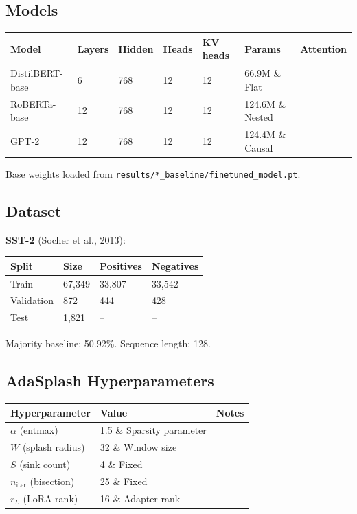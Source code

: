 \subsection{Models}

\begin{table}[H]
\centering
\small
\begin{tabular}{lllllll}
\toprule
\textbf{Model} & \textbf{Layers} & \textbf{Hidden} & \textbf{Heads} & \textbf{KV heads} & \textbf{Params} & \textbf{Attention} \\
\midrule
DistilBERT-base & 6 & 768 & 12 & 12 & 66.9M \& Flat \\
RoBERTa-base & 12 & 768 & 12 & 12 & 124.6M \& Nested \\
GPT-2 & 12 & 768 & 12 & 12 & 124.4M \& Causal \\
\bottomrule
\end{tabular}
\end{table}

Base weights loaded from \texttt{results/*\_baseline/finetuned\_model.pt}.

\subsection{Dataset}

\textbf{SST-2} (Socher et al., 2013):

\begin{table}[H]
\centering
\small
\begin{tabular}{llll}
\toprule
\textbf{Split} & \textbf{Size} & \textbf{Positives} & \textbf{Negatives} \\
\midrule
Train & 67,349 & 33,807 & 33,542 \\
Validation & 872 & 444 & 428 \\
Test & 1,821 & -- & -- \\
\bottomrule
\end{tabular}
\end{table}

Majority baseline: 50.92\%. Sequence length: 128.

\subsection{AdaSplash Hyperparameters}

\begin{table}[H]
\centering
\small
\begin{tabular}{lll}
\toprule
\textbf{Hyperparameter} & \textbf{Value} & \textbf{Notes} \\
\midrule
$\alpha$ (entmax) & 1.5 \& Sparsity parameter \\
$W$ (splash radius) & 32 \& Window size \\
$S$ (sink count) & 4 \& Fixed \\
$n_\text{iter}$ (bisection) & 25 \& Fixed \\
$r_L$ (LoRA rank) & 16 \& Adapter rank \\
\bottomrule
\end{tabular}
\end{table}

